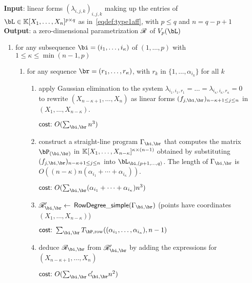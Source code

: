 \documentclass[12pt]{article}
\begin{document}
\begin{algorithm}[!t]
\caption{$\mathsf{RowDegreeDiagonal}((\lambda_{i,j,k})_{i,j,k})$}
{\bf Input}: linear forms $(\lambda_{i,j,k})_{i,j,k}$ making up 
the entries of 
$\bL \in \KK[X_1, \ldots, X_n]^{p \times q}$ as in~\eqref{eqdef:type1aff}, with $p \leq q$ and $n = q-p+1$\\
{\bf Output}: a zero-dimensional parametrization $\mathscr{R}$ of $V_p(\bL)$
\begin{enumerate}
\item for any subsequence $\bi = (i_1, \ldots, i_\kappa)$ of $(1, \ldots, p)$ with $1 \leq \kappa \leq\min(n-1,p)$
  \begin{enumerate}
  \item for any sequence $\br = (r_1, \ldots, r_\kappa)$, with $r_k$ in 
    $\{1,\dots,\alpha_{i_k}\}$ for all $k$
    \begin{enumerate}
    \item apply Gaussian elimination to the system 
      $\lambda_{i_1,i_1,r_1}=\dots=\lambda_{i_\kappa,i_\kappa,r_\kappa}=0$
      to rewrite $(X_{n-\kappa+1}, \ldots, X_n)$ as linear forms $(f_{j,\bi,\br})_{n-\kappa+1 \le j \le n}$ in $(X_1, \ldots, X_{n-\kappa})$. 

\hfill $\text{\sf{cost:~}} O(\sum_{\bi,\br} n^3)$
    \item\label{step:constSLP} construct a straight-line program $\Gamma_{\bi,\br}$ that computes the matrix $\bP_{(\bi,\br)}$ in $\mathbb{K}[X_1, \dots, X_{n-\kappa}]^{\kappa \times (n-1)}$ obtained
      by substituting $(f_{j,\bi,\br})_{n-\kappa+1 \le j \le n}$ into $\bL_{\bi,(p+1, \ldots, q)}$. The length of $\Gamma_{\bi,\br}$ is $O((n-\kappa) n(\alpha_{i_1}+\cdots+\alpha_{i_\kappa}))$.

\hfill $\text{\sf{cost:~}} O(\sum_{\bi,\br} (\alpha_{i_1} + \cdots + \alpha_{i_\kappa}) n^3)$
    \item $\scrR_{\bi,\br}' \gets$ $\mathsf{RowDegree\_simple}(\Gamma_{\bi,\br})$  (points have coordinates $(X_1, \ldots, X_{n-\kappa})$)

\hfill $\text{\sf{cost:~}} \sum_{\bi,\br} T_{\bP,{\rm row}}((\alpha_{i_1},\dots,\alpha_{i_\kappa}), n-1)$
    \item\label{step:substdiag} deduce $\scrR_{\bi,\br}$ from $\scrR_{\bi,\br}'$ by adding the expressions for $(X_{n-\kappa+1}, \ldots, X_n)$

\hfill      $\text{\sf{cost:~}} O(\sum_{\bi,\br}  c'_{\bi,\br} n^2)$
  \end{enumerate}
  \end{enumerate}


\end{enumerate}
\end{algorithm}
\end{document}
